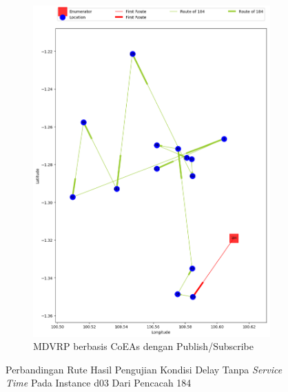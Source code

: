 \begin{figure}[H]\ContinuedFloat
	\centering
	\begin{subfigure}[t]{\textwidth}
		\centering
		\includegraphics[width=\textwidth]{Resources/Images/delayed_3/real_m15_n100_delayed_3_184_pubsub_coes}
		\caption{MDVRP berbasis CoEAs dengan Publish/Subscribe}
		\label{fig:real_m15_n100_delayed_3_184_pubsub_coes}
	\end{subfigure}
	\caption{Perbandingan Rute Hasil Pengujian Kondisi Delay Tanpa \textit{Service Time} Pada Instance d03 Dari Pencacah 184}
	\label{fig:real_m15_n100_delayed_3_184_contd}
\end{figure}


